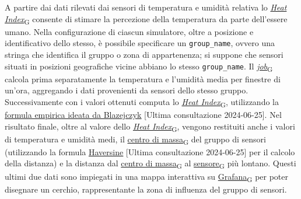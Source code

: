 A partire dai dati rilevati dai sensori di temperatura e umidità relativa lo \href{https://7last.github.io/docs/pb/documentazione-interna/glossario\#heat-index}{\textit{Heat Index}\textsubscript{G}} consente di stimare la percezione della temperatura da parte dell'essere umano.
Nella configurazione di ciascun simulatore, oltre a posizione e identificativo dello stesso, è possibile specificare un \texttt{group\_name}, ovvero una stringa che identifica
il gruppo o zona di appartenenza; si suppone che sensori situati in posizioni geografiche vicine abbiano lo stesso \texttt{group\_name}. Il \href{https://7last.github.io/docs/pb/documentazione-interna/glossario\#job}{\textit{job}\textsubscript{G}} calcola prima separatamente
la temperatura e l'umidità media per finestre di un'ora, aggregando i dati provenienti da sensori dello stesso gruppo. Successivamente con i valori ottenuti computa lo \href{https://7last.github.io/docs/pb/documentazione-interna/glossario\#heat-index}{\textit{Heat Index}\textsubscript{G}},
utilizzando la \\\underline{\href{https://www.ncbi.nlm.nih.gov/pmc/articles/PMC3801457/}{formula empirica ideata da Blazejczyk}} [Ultima consultazione 2024-06-25].
Nel risultato finale, oltre al valore dello \href{https://7last.github.io/docs/pb/documentazione-interna/glossario\#heat-index}{\textit{Heat Index}\textsubscript{G}}, vengono restituiti anche i valori di temperatura e umidità medi, il \href{https://7last.github.io/docs/pb/documentazione-interna/glossario\#centro-di-massa}{centro di massa\textsubscript{G}} del gruppo di sensori
(utilizzando la formula \underline{\href{https://en.wikipedia.org/wiki/Haversine_formula}{Haversine}} [Ultima consultazione 2024-06-25] per il calcolo della distanza) e la
distanza dal \href{https://7last.github.io/docs/pb/documentazione-interna/glossario\#centro-di-massa}{centro di massa\textsubscript{G}} al \href{https://7last.github.io/docs/pb/documentazione-interna/glossario\#sensore}{sensore\textsubscript{G}} più lontano. Questi ultimi due dati sono impiegati in una mappa interattiva su \href{https://7last.github.io/docs/pb/documentazione-interna/glossario\#grafana}{Grafana\textsubscript{G}} per poter disegnare un cerchio,
rappresentante la zona di influenza del gruppo di sensori.

